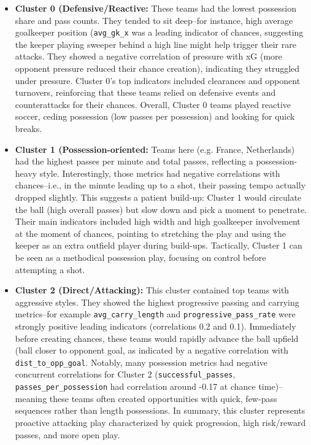 \documentclass[11pt]{article}
\begin{document}
\begin{itemize}
    \item \textbf{Cluster 0 (Defensive/Reactive:} These teams had the lowest possession share and pass counts. They tended to sit deep--for instance, high average goalkeeper position (\texttt{avg\_gk\_x} was a leading indicator of chances, suggesting the keeper playing sweeper behind a high line might help trigger their rare attacks. They showed a negative correlation of pressure with xG (more opponent pressure reduced their chance creation), indicating they struggled under pressure. Cluster 0's top indicators included clearances and opponent turnovers, reinforcing that these teams relied on defensive events and counterattacks for their chances. Overall, Cluster 0 teams played reactive soccer, ceding possession (low passes per possession) and looking for quick breaks. 
    \item \textbf{Cluster 1 (Possession-oriented:} Teams here (e.g. France, Netherlands) had the highest passes per minute and total passes, reflecting a possession-heavy style. Interestingly, those metrics had negative correlations with chances--i.e., in the minute leading up to a shot, their passing tempo actually dropped slightly. This suggests a patient build-up: Cluster 1 would circulate the ball (high overall passes) but slow down and pick a moment to penetrate. Their main indicators included high width and high goalkeeper involvement at the moment of chances, pointing to stretching the play and using the keeper as an extra outfield player during build-ups. Tactically, Cluster 1 can be seen as a methodical possession play, focusing on control before attempting a shot. 
    \item \textbf{Cluster 2 (Direct/Attacking):} This cluster contained top teams with aggressive styles. They showed the highest progressive passing and carrying metrics--for example \texttt{avg\_carry\_length} and \texttt{progressive\_pass\_rate} were strongly positive leading indicators (correlations 0.2 and 0.1). Immediately before creating chances, these teams would rapidly advance the ball upfield (ball closer to opponent goal, as indicated by a negative correlation with \texttt{dist\_to\_opp\_goal}. Notably, many possession metrics had negative concurrent correlations for Cluster 2 (\texttt{successful\_passes}, \texttt{passes\_per\_possession} had correlation around -0.17 at chance time)--meaning these teams often created opportunities with quick, few-pass sequences rather than length possessions. In summary, this cluster represents proactive attacking play characterized by quick progression, high risk/reward passes, and more open play.
\end{itemize}
\end{document}

